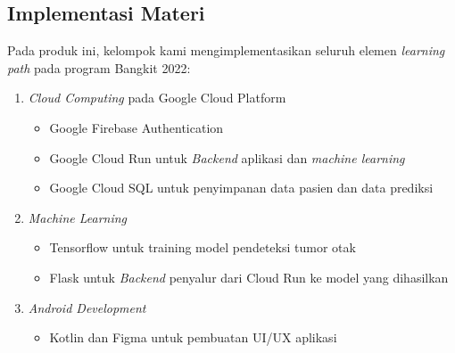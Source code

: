 \subsection{Implementasi Materi}
Pada produk ini, kelompok kami mengimplementasikan seluruh elemen \textit{learning path} pada program Bangkit 2022:
\begin{enumerate}
	\item \textit{Cloud Computing} pada Google Cloud Platform
	\begin{itemize}
		\item Google Firebase Authentication
		\item Google Cloud Run untuk \textit{Backend} aplikasi dan \textit{machine learning}
		\item Google Cloud SQL untuk penyimpanan data pasien dan data prediksi
	\end{itemize}
	\item \textit{Machine Learning}
	\begin{itemize}
		\item Tensorflow untuk training model pendeteksi tumor otak
		\item Flask untuk \textit{Backend} penyalur dari Cloud Run ke model yang dihasilkan
	\end{itemize}
	\item \textit{Android Development}
	\begin{itemize}
		\item Kotlin dan Figma untuk pembuatan UI/UX aplikasi
	\end{itemize}
\end{enumerate}